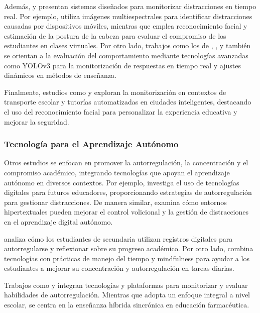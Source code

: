 \documentclass[a4paper,fleqn]{cas-sc}
\begin{document}
			Además, \cite{Campbell2015Using} y \cite{Ucar2022Recognizing} presentan sistemas diseñados para monitorizar distracciones en tiempo real. Por ejemplo, \cite{Campbell2015Using} utiliza imágenes multiespectrales para identificar distracciones causadas por dispositivos móviles, mientras que \cite{Ucar2022Recognizing} emplea reconocimiento facial y estimación de la postura de la cabeza para evaluar el compromiso de los estudiantes en clases virtuales. Por otro lado, trabajos como los de \cite{Argel2023Intellitell}, \cite{Erazo2016Easing}, y \cite{Nguyen2019} también se orientan a la evaluación del comportamiento mediante tecnologías avanzadas como YOLOv3 para la monitorización de respuestas en tiempo real y ajustes dinámicos en métodos de enseñanza.
			
			Finalmente, estudios como \cite{Boumiza2017} y \cite{DaCosta2023} exploran la monitorización en contextos de transporte escolar y tutorías automatizadas en ciudades inteligentes, destacando el uso del reconocimiento facial para personalizar la experiencia educativa y mejorar la seguridad.
			
		\subsubsection{Tecnología para el Aprendizaje Autónomo}
			Otros estudios se enfocan en promover la autorregulación, la concentración y el compromiso académico, integrando tecnologías que apoyan el aprendizaje autónomo en diversos contextos. Por ejemplo, \cite{Bembich2016Future} investiga el uso de tecnologías digitales para futuros educadores, proporcionando estrategias de autorregulación para gestionar distracciones. De manera similar, \cite{Peters2003Self} examina cómo entornos hipertextuales pueden mejorar el control volicional y la gestión de distracciones en el aprendizaje digital autónomo.
			
			\cite{Roberts2020Task} analiza cómo los estudiantes de secundaria utilizan registros digitales para autorregularse y reflexionar sobre su progreso académico. Por otro lado, \cite{Adcroft2018Developing} combina tecnologías con prácticas de manejo del tiempo y mindfulness para ayudar a los estudiantes a mejorar su concentración y autorregulación en tareas diarias.
			
			Trabajos como \cite{Salter2014Exploring} y \cite{Palmer2022impact} integran tecnologías y plataformas para monitorizar y evaluar habilidades de autorregulación. Mientras que \cite{Salter2014Exploring} adopta un enfoque integral a nivel escolar, \cite{Palmer2022impact} se centra en la enseñanza híbrida sincrónica en educación farmacéutica.
			
\end{document}
